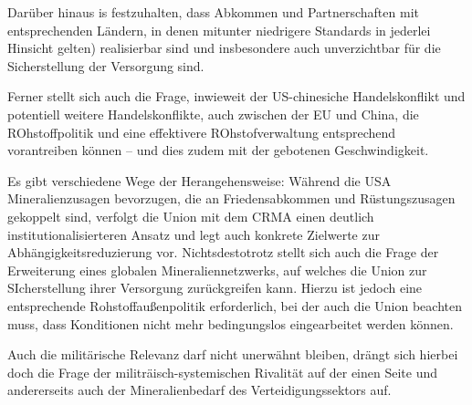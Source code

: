 \documentclass[12pt,a4paper,oneside]{book} %
\begin{document}
Darüber hinaus is festzuhalten, dass Abkommen und Partnerschaften mit entsprechenden Ländern, in denen mitunter niedrigere Standards in jederlei Hinsicht gelten) realisierbar sind und insbesondere auch unverzichtbar für die Sicherstellung der Versorgung sind.

Ferner stellt sich auch die Frage, inwieweit der US-chinesiche Handelskonflikt und potentiell weitere Handelskonflikte, auch zwischen der EU und China, die ROhstoffpolitik und eine effektivere ROhstofverwaltung entsprechend vorantreiben können -- und dies zudem mit der gebotenen Geschwindigkeit.

Es gibt verschiedene Wege der Herangehensweise: Während die USA Mineralienzusagen bevorzugen, die an Friedensabkommen und Rüstungszusagen gekoppelt sind, verfolgt die Union mit dem CRMA einen deutlich institutionalisierteren Ansatz und legt auch konkrete Zielwerte zur Abhängigkeitsreduzierung vor. Nichtsdestotrotz stellt sich auch die Frage der Erweiterung eines globalen Mineraliennetzwerks, auf welches die Union zur SIcherstellung ihrer Versorgung zurückgreifen kann. Hierzu ist jedoch eine entsprechende Rohstoffaußenpolitik erforderlich, bei der auch die Union beachten muss, dass Konditionen nicht mehr bedingungslos eingearbeitet werden können. 

Auch die militärische Relevanz darf nicht unerwähnt bleiben, drängt sich hierbei doch die Frage der militräisch-systemischen Rivalität auf der einen Seite und andererseits auch der Mineralienbedarf des Verteidigungssektors auf.

	
\end{document}
